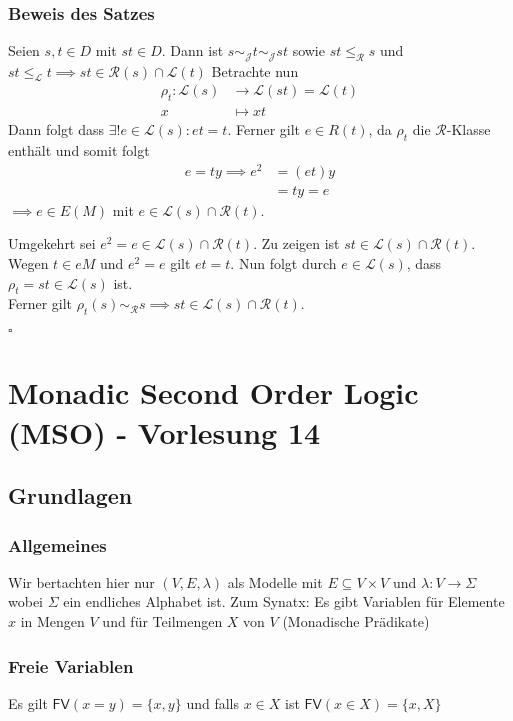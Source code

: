 \documentclass[12pt, german]{article}
\newcommand{\grer}{\sim_{\mathcal{R}}}
\newcommand{\grej}{\sim_{\mathcal{J}}}
\newcommand{\lgreleq}{\leqslant_{\mathcal{L}}}
\newcommand{\lgrereq}{\leqslant_{\mathcal{R}}}
\newcommand{\lcal}{\mathcal L}
\newcommand{\rcal}{\mathcal R}
\newcommand{\fv}{\mathsf{FV}}
\newcommand{\bewiesen}{
	
	\begin{flushright}
		$\square$  \\
\end{flushright}}
\begin{document}
	\subsubsection{Beweis des Satzes}
	Seien $s,t \in D$ mit $st \in D$. Dann ist $s \grej t \grej st$ sowie $st \lgrereq s$ und $st \lgreleq t \implies st \in \rcal(s) \cap \lcal(t)$
	Betrachte nun 
	\begin{align*}
		\rho_t : \lcal(s) &\to \lcal(st) = \lcal(t) \\
		x &\mapsto xt
	\end{align*}
	Dann folgt dass $\exists! e \in \lcal(s): et = t$. Ferner gilt $e \in R(t)$, da $\rho_t$ die $\rcal$-Klasse  enthält und somit folgt 
	\begin{align*}
		e = ty \implies e^2 &= (et)y \\
		&=ty = e
	\end{align*}
	$\implies e \in E(M)$ mit $e \in \lcal(s) \cap \rcal(t)$. 
	\newline
	
	Umgekehrt sei $e^2 = e \in \lcal(s) \cap \rcal(t)$. Zu zeigen ist $st \in \lcal(s) \cap \rcal(t)$. \\
	Wegen $ t \in eM$ und $e^2 = e$ gilt $et =t$.
	Nun folgt durch $e \in \lcal(s)$, dass $\rho_t = st \in \lcal(s)$ ist. \\ 
	Ferner gilt $\rho_t(s) \grer s \implies st \in \lcal(s) \cap \rcal(t)$.
	\bewiesen
	
\section{Monadic Second Order Logic (MSO) - Vorlesung 14}
\subsection{Grundlagen}
\subsubsection{Allgemeines}
Wir bertachten hier nur $(V, E ,\lambda)$ als Modelle mit $E \subseteq V \times V$ und $\lambda : V \to \Sigma$ wobei $\Sigma$ ein endliches Alphabet ist.
Zum Synatx: Es gibt Variablen für Elemente $x$ in Mengen $V$ und für Teilmengen $X$ von $V$ (Monadische Prädikate)

\subsubsection{Freie Variablen}
	Es gilt $\fv(x=y)=\{x,y\}$ und falls $x \in X$ ist $\fv(x \in X) = \{x, X\}$
\end{document}
